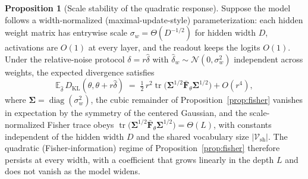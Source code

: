 \documentclass[11pt]{article}
\newcommand{\Vsh}{\mathcal{V}_{\mathrm{sh}}}
\newcommand{\E}{\mathbb{E}}
\theoremstyle{definition}
\newtheorem{proposition}{Proposition}
\begin{document}
\begin{proposition}[Scale stability of the quadratic response]
\label{prop:scale}
Suppose the model follows a width-normalized (maximal-update-style)
parameterization: each hidden weight matrix has entrywise scale
$\sigma_w = \Theta(D^{-1/2})$ for hidden width $D$, activations are $O(1)$ at
every layer, and the readout keeps the logits $O(1)$. Under the relative-noise
protocol $\delta = r\hat\delta$ with $\hat\delta_w \sim
\mathcal{N}(0,\sigma_w^2)$ independent across weights, the expected divergence
satisfies
\begin{equation}
  \E_{\hat\delta}\, D_{\mathrm{KL}}(\theta, \theta + r\hat\delta)
  \;=\; \tfrac12\, r^2 \operatorname{tr}\!\big(\bm{\Sigma}^{1/2}
  \bar{\bm{F}}_\theta \bm{\Sigma}^{1/2}\big) + O(r^4),
  \label{eq:scale}
\end{equation}
where $\bm{\Sigma} = \operatorname{diag}(\sigma_w^2)$, the cubic remainder of
Proposition~\ref{prop:fisher} vanishes in expectation by the symmetry of the
centered Gaussian, and the scale-normalized Fisher trace obeys
$\operatorname{tr}\!\big(\bm{\Sigma}^{1/2}\bar{\bm{F}}_\theta
\bm{\Sigma}^{1/2}\big) = \Theta(L)$, with constants independent of the hidden
width $D$ and the shared vocabulary size $|\Vsh|$. The quadratic
(Fisher-information) regime of Proposition~\ref{prop:fisher} therefore persists
at every width, with a coefficient that grows linearly in the depth $L$ and
does not vanish as the model widens.
\end{proposition}
\end{document}
